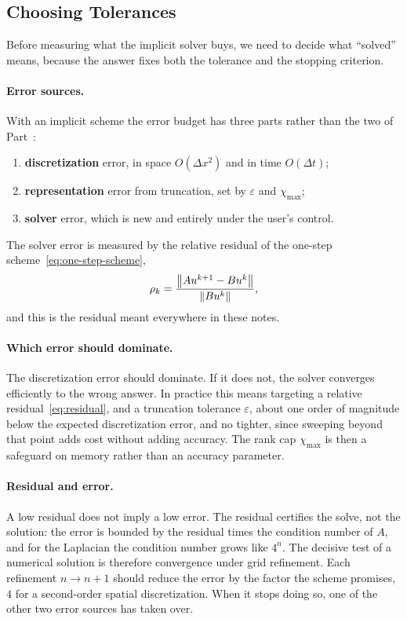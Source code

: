 \subsection{Choosing Tolerances}
\label{subsec:error-budget}

Before measuring what the implicit solver buys, we need to decide what
\enquote{solved} means, because the answer fixes both the tolerance and the
stopping criterion.

\paragraph{Error sources.}
With an implicit scheme the error budget has three parts rather than the two of
Part~:
\begin{enumerate}
  \item \textbf{discretization} error, in space $O(\Delta x^2)$ and in time
    $O(\Delta t)$;
  \item \textbf{representation} error from truncation, set by $\varepsilon$
    and $\chi_{\max}$;
  \item \textbf{solver} error, which is new and entirely under the user's
    control.
\end{enumerate}
The solver error is measured by the relative residual of the one-step
scheme~\eqref{eq:one-step-scheme},
\begin{equation}
  \rho_k = \frac{\left\|A u^{k+1} - B u^{k}\right\|}{\left\|B u^{k}\right\|} ,
  \label{eq:residual}
\end{equation}
and this is the residual meant everywhere in these notes.

\paragraph{Which error should dominate.}
The discretization error should dominate. If it does not, the solver converges
efficiently to the wrong answer. In practice this means targeting a relative
residual~\eqref{eq:residual}, and a truncation tolerance $\varepsilon$, about one
order of magnitude below the expected discretization error, and no tighter,
since sweeping beyond that point adds cost without adding accuracy. The rank cap
$\chi_{\max}$ is then a safeguard on memory rather than an accuracy parameter.

\paragraph{Residual and error.}
A low residual does not imply a low error. The residual certifies the solve, not
the solution: the error is bounded by the residual times the condition number of
$A$, and for the Laplacian the condition number grows like $4^{n}$. The decisive
test of a numerical solution is therefore convergence under grid refinement.
Each refinement $n \to n+1$ should reduce the error by the factor the scheme
promises, $4$ for a second-order spatial discretization. When it stops doing so,
one of the other two error sources has taken over.

